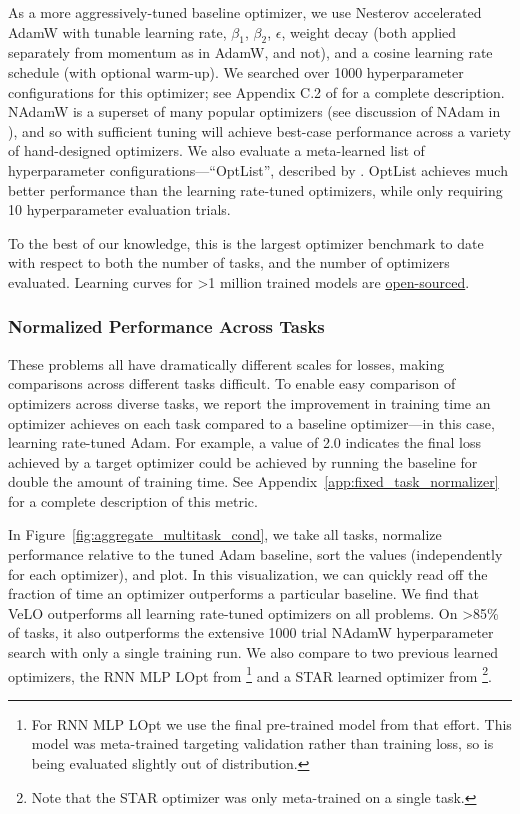 \documentclass[11pt]{article}
\begin{document}
As a more aggressively-tuned baseline optimizer, we use Nesterov accelerated AdamW \citep{dozat2016incorporating} with tunable learning rate, $\beta_1$, $\beta_2$, $\epsilon$, weight decay (both applied separately from momentum as in AdamW, and not), and a cosine learning rate schedule (with optional warm-up). 
We searched over 1000 hyperparameter configurations for this optimizer; see Appendix C.2 of \citet{metz2019using} for a complete description. 
NAdamW is a superset of many popular optimizers (see discussion of NAdam in \citet{choi2019empirical}), and so with sufficient tuning will achieve best-case performance across a variety of hand-designed optimizers.
We also evaluate a meta-learned list of hyperparameter configurations---``OptList'', described by \citet{metz2019using}.
OptList achieves much better performance than the learning rate-tuned optimizers, while only requiring 10 hyperparameter evaluation trials.

To the best of our knowledge, this is the largest optimizer benchmark to date with respect to both the number of tasks, and the number of optimizers evaluated.
Learning curves for >1 million trained models are \href{https://learned-optimization.readthedocs.io/en/latest/optimizer_baselines.html}{open-sourced}.

\subsubsection{Normalized Performance Across Tasks}
These problems all have dramatically different scales for losses, making comparisons across different tasks difficult.
To enable easy comparison of optimizers across diverse tasks, we report the improvement in training time an optimizer achieves on each task compared to a baseline optimizer---in this case, learning rate-tuned Adam.
For example, a value of 2.0 indicates the final loss achieved by a target optimizer could be achieved by running the baseline for double the amount of training time.
See Appendix~\ref{app:fixed_task_normalizer} for a complete description of this metric.

In Figure~\ref{fig:aggregate_multitask_cond}, we take all tasks, normalize performance relative to the tuned Adam baseline, sort the values (independently for each optimizer), and plot.
In this visualization, we can quickly read off the fraction of time an optimizer outperforms a particular baseline.
We find that VeLO outperforms all learning rate-tuned optimizers on all problems.
On >85\% of tasks, it also outperforms the extensive 1000 trial NAdamW hyperparameter search with only a single training run. 
We also compare to two previous learned optimizers, the RNN MLP LOpt from \citet{metz2020tasks}\footnote{For RNN MLP LOpt we use the final pre-trained model from that effort. This model was meta-trained targeting validation rather than training loss, so is being evaluated slightly out of distribution.} and a STAR learned optimizer from \citet{harrison2022closer}\footnote{Note that the STAR optimizer was only meta-trained on a single task.}.
\end{document}
